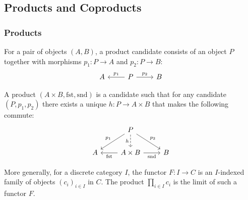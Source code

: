 \subsection{Products and Coproducts}

\subsubsection*{Products}

\begin{definition}

	For a pair of objects $(A, B)$, a product candidate consists of an object $P$
	together with morphisms $p_1: P\to A$ and $p_2:P\to B$:
	\[\begin{tikzcd}[ampersand replacement=\&]
		A \& P \& B
		\arrow["{p_1}"', from=1-2, to=1-1]
		\arrow["{p_2}", from=1-2, to=1-3]
	\end{tikzcd}\]

	A product $(A\times B, \mathrm{fst}, \mathrm{snd})$ is a candidate such that
	for any candidate $(P, p_1, p_2)$ there exists a unique $h: P\to A\times B$
	that makes the following commute:
	\parencite{leinster:basic_category_theory}
	\[\begin{tikzcd}[ampersand replacement=\&]
		\& P \\
		A \& {A\times B} \& B
		\arrow["{\mathrm{fst}}", from=2-2, to=2-1]
		\arrow["{\mathrm{snd}}"', from=2-2, to=2-3]
		\arrow["{p_1}"', from=1-2, to=2-1]
		\arrow["{p_2}", from=1-2, to=2-3]
		\arrow["h"', dashed, from=1-2, to=2-2]
	\end{tikzcd}\]
\end{definition}

\begin{definition}

	More generally, for a discrete category $I$, the functor $F:I\to C$ is an
	$I$-indexed family of objects $(c_i)_{i\in I}$ in $C$. The product
	$\prod_{i\in I} c_i$ is the limit of such a functor $F$.
	\parencite{leinster:basic_category_theory}
\end{definition}

